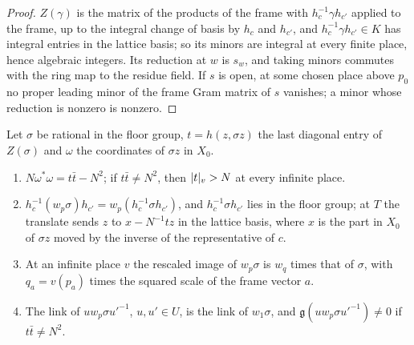 \begin{proof}
$Z(\gamma)$ is the matrix of the products of the frame with $h_c^{-1}\gamma h_{c'}$ applied to the frame, up to the integral change of basis by $h_c$ and $h_{c'}$, and $h_c^{-1}\gamma h_{c'}\in K$
has integral entries in the lattice basis; so its minors are integral at every finite place, hence algebraic integers. Its reduction at $w$ is $s_w$, and taking minors commutes with the ring map to the residue
field. If $s$ is open, at some chosen place above $p_0$ no proper leading minor of the frame Gram matrix of $s$ vanishes; a minor whose reduction is nonzero is nonzero.
\end{proof}

\begin{lemma}\label{lem:weyl-norm}
Let $\sigma$ be rational in the floor group, $t=h(z,\sigma z)$ the last diagonal entry of $Z(\sigma)$ and $\omega$ the coordinates of $\sigma z$ in $X_0$.
\begin{enumerate}[label=\textup{(\alph*)}]
\item $N\omega^*\omega=t\bar t-N^2$; if $t\bar t\ne N^2$, then $\lvert t\rvert_v>N$ at every infinite place.
\item $h_c^{-1}(w_p\sigma)h_{c'}=w_p(h_c^{-1}\sigma h_{c'})$, and $h_c^{-1}\sigma h_{c'}$ lies in the floor group; at $T$ the translate sends $z$ to $x-N^{-1}tz$ in the lattice basis, where $x$ is the part in $X_0$ of $\sigma z$
moved by the inverse of the representative of $c$.
\item At an infinite place $v$ the rescaled image of $w_p\sigma$ is $w_q$ times that of $\sigma$, with $q_a=v(p_a)$ times the squared scale of the frame vector $a$.
\item The link of $uw_p\sigma u'^{-1}$, $u,u'\in U$, is the link of $w_1\sigma$, and $\mathfrak g(uw_p\sigma u'^{-1})\ne0$ if $t\bar t\ne N^2$.
\end{enumerate}
\end{lemma}

